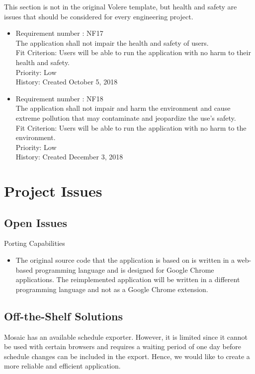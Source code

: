 \documentclass[12pt, titlepage]{article}
\begin{document}
This section is not in the original Volere template, but health and safety are
issues that should be considered for every engineering project.
\begin{itemize}
\item Requirement number : NF17\\
The application shall not impair the health and safety of users.\\
Fit Criterion:  Users will be able to run the application with no harm to their health and safety. \\
Priority: Low\\
History: Created October 5, 2018
\color{blue}
\item Requirement number : NF18\\
The application shall not impair and harm the environment and cause extreme pollution that may contaminate and  jeopardize the use's safety.\\
Fit Criterion:  Users will be able to run the application with no harm to the environment. \\
Priority: Low\\
History: Created December 3, 2018
\color{black}
\end{itemize}
\section{Project Issues}

\subsection{Open Issues}
Porting Capabilities
\begin{itemize}
\item
The original source code that the application is based on is written in a web-based programming language and is designed for Google Chrome applications. The reimplemented application will be written in a different programming language and not as a Google Chrome extension.
\end{itemize}
\subsection{Off-the-Shelf Solutions}
\hspace{5mm}
Mosaic has an available schedule exporter. However, it is limited since it cannot be used with certain browsers and requires a waiting period of one day before schedule changes can be included in the export. Hence, we would like to create a more reliable and efficient application.\\
\end{document}
